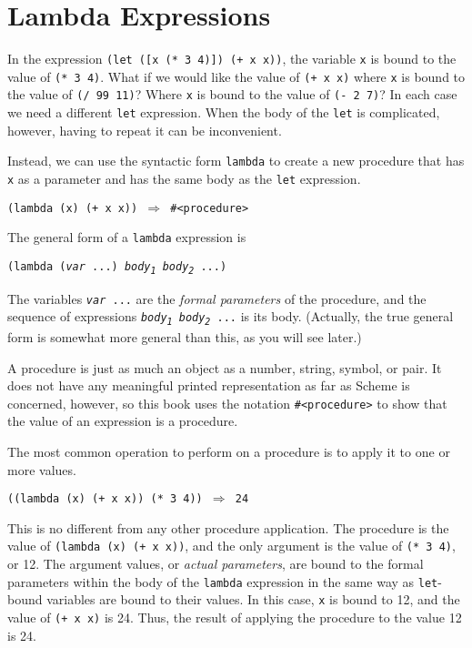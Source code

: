 \section{\label{start_g21}\label{start_h5}Lambda Expressions\label{start_SECTGSLAMBDA}}



In the expression \texttt{(let ([x (* 3 4)]) (+ x x))}, the variable
\texttt{x} is bound to the value of \texttt{(* 3 4)}.
What if we would like the value of \texttt{(+ x x)} where \texttt{x} is
bound to the value of \texttt{(/ 99 11)}?
Where \texttt{x} is bound to the value of \texttt{(- 2 7)}?
In each case we need a different \texttt{let} expression.
When the body of the \texttt{let} is complicated, however, having to
repeat it can be inconvenient.


Instead, we can use the syntactic form \label{start_s60}\texttt{lambda} to create a new
\label{start_s61}procedure that has \texttt{x} as a parameter and has the same
body as the \texttt{let} expression.


\texttt{(lambda (x) (+ x x)) \(\Rightarrow\) \#{}\textless{}procedure\textgreater{}}

The general form of a \texttt{lambda} expression is


\texttt{(lambda (\textit{var} ...) \textit{body\textsubscript{1}} \textit{body\textsubscript{2}} ...)}

The variables \texttt{\textit{var} ...} are the \label{start_s62}\textit{formal parameters}
of the procedure, and the sequence of expressions
\texttt{\textit{body\textsubscript{1}} \textit{body\textsubscript{2}} ...} is its body.
(Actually, the true general form is somewhat more general than this,
as you will see later.)


A procedure is just as much an object as a number, string, symbol,
or pair.
It does not have any meaningful printed representation as
far as Scheme is concerned, however, so this book uses the notation
\texttt{\#{}\textless{}procedure\textgreater{}} to show that the value of an expression is a
procedure.


The most common operation to perform on a procedure is to apply it
to one or more values.


\texttt{((lambda (x) (+ x x)) (* 3 4)) \(\Rightarrow\) 24}

This is no different from any other \label{start_s63}procedure application.
The procedure is the value of \texttt{(lambda (x) (+ x x))}, and the
only argument is the value of \texttt{(* 3 4)}, or 12.
The argument values, or \label{start_s64}\textit{actual parameters}, are bound to the
formal parameters within the body of the \texttt{lambda} expression
in the same way as \texttt{let}-bound variables are bound to their values.
In this case, \texttt{x} is bound to 12, and
the value of \texttt{(+ x x)} is 24.
Thus, the result of applying the procedure to the value 12 is 24.


